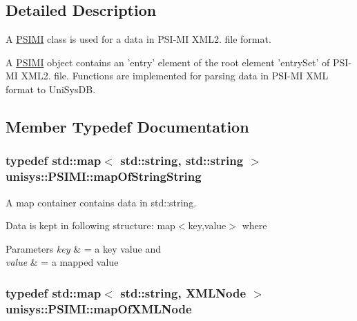 \subsection{Detailed Description}
A \hyperlink{classunisys_1_1PSIMI}{P\-S\-I\-M\-I} class is used for a data in P\-S\-I-\/\-M\-I X\-M\-L2. file format. 

A \hyperlink{classunisys_1_1PSIMI}{P\-S\-I\-M\-I} object contains an 'entry' element of the root element 'entry\-Set' of P\-S\-I-\/\-M\-I X\-M\-L2. file. Functions are implemented for parsing data in P\-S\-I-\/\-M\-I X\-M\-L format to Uni\-Sys\-D\-B. 

\subsection{Member Typedef Documentation}
\hypertarget{classunisys_1_1PSIMI_acf60eee34b73f37af16a0aea2aecebd3}{
\subsubsection[{map\-Of\-String\-String}]{\setlength{\rightskip}{0pt plus 5cm}typedef std\-::map$<$ std\-::string, std\-::string $>$ {\bf unisys\-::\-P\-S\-I\-M\-I\-::map\-Of\-String\-String}}}\label{classunisys_1_1PSIMI_acf60eee34b73f37af16a0aea2aecebd3}


A map container contains data in std\-::string. 

Data is kept in following structure\-: map$<$key,value$>$ where 
\begin{DoxyParams}{Parameters}
{\em key} & = a key value and \\
\hline
{\em value} & = a mapped value \\
\hline
\end{DoxyParams}
\hypertarget{classunisys_1_1PSIMI_a0cc51198d3cd685cfa21a42c5dc0ee7f}{
\subsubsection[{map\-Of\-X\-M\-L\-Node}]{\setlength{\rightskip}{0pt plus 5cm}typedef std\-::map$<$ std\-::string, {\bf X\-M\-L\-Node} $>$ {\bf unisys\-::\-P\-S\-I\-M\-I\-::map\-Of\-X\-M\-L\-Node}}}\label{classunisys_1_1PSIMI_a0cc51198d3cd685cfa21a42c5dc0ee7f}



